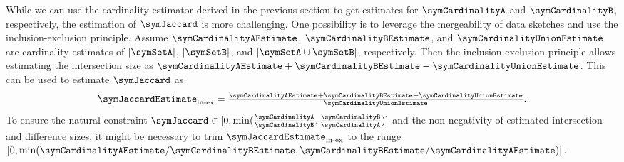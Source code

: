 \documentclass[sigconf, nonacm]{acmart}
\begin{document}
While we can use the cardinality estimator derived in the previous section to get estimates for $\symCardinalityA$ and $\symCardinalityB$, respectively, the estimation of $\symJaccard$ is more challenging. 
One possibility is to leverage the mergeability of data sketches and use the inclusion-exclusion principle. Assume $\symCardinalityAEstimate$, $\symCardinalityBEstimate$, and $\symCardinalityUnionEstimate$ are cardinality estimates of $|\symSetA|$, $|\symSetB|$, and $|\symSetA\cup\symSetB|$, respectively. Then the inclusion-exclusion principle allows estimating the intersection size as $\symCardinalityAEstimate+\symCardinalityBEstimate-\symCardinalityUnionEstimate$. This can be used to estimate $\symJaccard$ as
\begin{equation}
\label{equ:joint_incl_excl}
{\textstyle
\symJaccardEstimate_\textnormal{in-ex} = 
\frac{\symCardinalityAEstimate + \symCardinalityBEstimate-\symCardinalityUnionEstimate}{\symCardinalityUnionEstimate}}.
\end{equation}
To ensure the natural constraint $\symJaccard\in[0,\min({\textstyle\frac{\symCardinalityA}{\symCardinalityB},\frac{\symCardinalityB}{\symCardinalityA}})]$ and the non-negativity of estimated intersection and difference sizes, it might be necessary to trim $\symJaccardEstimate_\textnormal{in-ex}$ to the range $[0, \min(\symCardinalityAEstimate/\symCardinalityBEstimate,\symCardinalityBEstimate/\symCardinalityAEstimate)]$.
\end{document}
